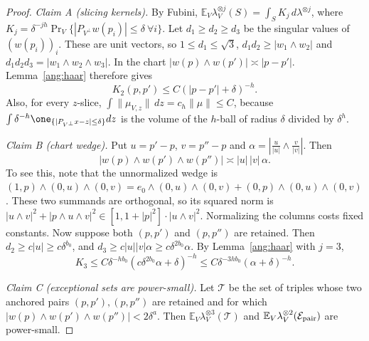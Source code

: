 \documentclass[11pt,reqno]{amsart}
\begin{document}
\begin{proof}
\emph{Claim A (slicing kernels).} By Fubini, $\mathbb E_V\lambda_V^{\otimes j}(S)=\int_S K_j\,d\lambda^{\otimes j}$, where $K_j=\delta^{-jh}\Pr_V\{|P_{V^\perp}w(p_i)|\le\delta\ \forall i\}$. Let $d_1\ge d_2\ge d_3$ be the singular values of $(w(p_i))_i$. These are unit vectors, so $1\le d_1\le\sqrt3$, $d_1d_2\ge|w_1\wedge w_2|$ and $d_1d_2d_3=|w_1\wedge w_2\wedge w_3|$. In the chart $|w(p)\wedge w(p')|\asymp|p-p'|$. Lemma~\ref{ang:haar} therefore gives
\[
 K_2(p,p')\le C(|p-p'|+\delta)^{-h}.
\]
Also, for every $z$-slice, $\int\|\mu_{V,z}\|\,dz=c_h\|\mu\|\le C$, because $\int\delta^{-h}\one_{\{|P_{V^\perp}x-z|\le\delta\}}dz$ is the volume of the $h$-ball of radius $\delta$ divided by $\delta^h$.

\emph{Claim B (chart wedge).} Put $u=p'-p$, $v=p''-p$ and $\alpha=|\frac{u}{|u|}\wedge\frac{v}{|v|}|$. Then
\[
 |w(p)\wedge w(p')\wedge w(p'')|\asymp|u|\,|v|\,\alpha .
\]
To see this, note that the unnormalized wedge is $(1,p)\wedge(0,u)\wedge(0,v)=e_0\wedge(0,u)\wedge(0,v)+(0,p)\wedge(0,u)\wedge(0,v)$. These two summands are orthogonal, so its squared norm is $|u\wedge v|^2+|p\wedge u\wedge v|^2\in[1,1+|p|^2]\cdot|u\wedge v|^2$. Normalizing the columns costs fixed constants. Now suppose both $(p,p')$ and $(p,p'')$ are retained. Then $d_2\ge c|u|\ge c\delta^{b_0}$, and $d_3\ge c|u||v|\alpha\ge c\delta^{2b_0}\alpha$. By Lemma~\ref{ang:haar} with $j=3$,
\begin{equation}\label{eq:K3}
 K_3\le C\delta^{-hb_0}(c\delta^{2b_0}\alpha+\delta)^{-h}\le C\delta^{-3hb_0}(\alpha+\delta)^{-h}.
\end{equation}

\emph{Claim C (exceptional sets are power-small).} Let $\mathcal T$ be the set of triples whose two anchored pairs $(p,p'),(p,p'')$ are retained and for which $|w(p)\wedge w(p')\wedge w(p'')|<2\delta^a$. Then $\mathbb E_V\lambda_V^{\otimes3}(\mathcal T)$ and $\mathbb E_V\lambda_V^{\otimes2}(\mathcal E_{\rm pair})$ are power-small.


\end{proof}
\end{document}
